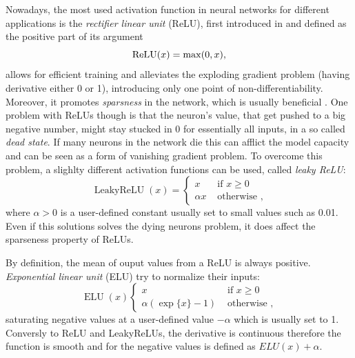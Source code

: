 \documentclass[LaM,binding=0.6cm]{./packages/sapthesis/sapthesis}
\begin{document}
            Nowadays, the most used activation function in neural networks for different applications is the \textit{rectifier linear unit} (ReLU),
            first introduced in \cite{relu} and defined as the positive part of its argument
            \begin{equation}
                \textnormal{ReLU}(x) = \max(0, x),
            \end{equation}
            allows for efficient training and alleviates the exploding gradient problem (having derivative either 0 or 1), introducing only one point of
            non-differentiability. Moreover, it promotes \textit{sparsness} in the network, which is usually beneficial \cite{sparseness}. One problem with ReLUs though 
            is that the neuron's value, that get pushed to a big negative number, might stay stucked in 0 for essentially all inputs, in a so called \textit{dead state}.
            If many neurons in the network die this can afflict the model capacity and can be seen as a form of vanishing gradient problem. To overcome this problem,
            a slighlty different activation functions can be used, called \textit{leaky ReLU}:
            \begin{equation}
                \operatorname{Leaky ReLU}(x)=\left\{\begin{array}{ll}
                    x & \text { if } x \geq 0 \\
                    \alpha x & \text { otherwise },
                    \end{array}\right.
            \end{equation}
            where $\alpha > 0$ is a user-defined constant usually set to small values such as 0.01. Even if this solutions solves the dying neurons problem, it does
            affect the sparseness property of ReLUs.
            
            By definition, the mean of ouput values from a ReLU is always positive. \textit{Exponential linear unit} (ELU) try to normalize their inputs:
            \begin{equation}
                \label{elu}
                \operatorname{ELU}(x)\left\{\begin{array}{ll}
                    x & \text { if } x \geq 0 \\
                    \alpha(\exp \{x\}-1) & \text { otherwise },
                    \end{array}\right.
            \end{equation}
            saturating negative values at a user-defined value $- \alpha$ which is usually set to 1. Conversly to ReLU and LeakyReLUs, the derivative is continuous
            therefore the function is smooth and for the negative values is defined as $ELU(x) + \alpha$.
\end{document}
